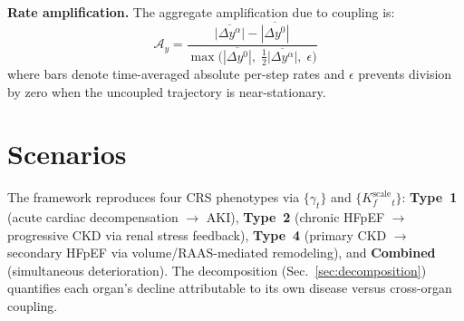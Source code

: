 \documentclass[10pt,twocolumn]{article}
\begin{document}
\textbf{Rate amplification.} The aggregate amplification due to coupling is:
\begin{equation}
\mathcal{A}_y = \frac{\overline{|\Delta y^{\alpha}|} - \overline{|\Delta y^{0}|}}{\max\!\bigl(\overline{|\Delta y^{0}|},\; \tfrac{1}{2}\overline{|\Delta y^{\alpha}|},\; \epsilon\bigr)}
\label{eq:amplification}
\end{equation}
where bars denote time-averaged absolute per-step rates and $\epsilon$ prevents division by zero when the uncoupled trajectory is near-stationary.

\section{Scenarios}
\label{sec:scenarios}

The framework reproduces four CRS phenotypes via $\{\gamma_t\}$ and $\{K_f^{\text{scale}}_t\}$: \textbf{Type~1} (acute cardiac decompensation $\to$ AKI), \textbf{Type~2} (chronic HFpEF $\to$ progressive CKD via renal stress feedback), \textbf{Type~4} (primary CKD $\to$ secondary HFpEF via volume/RAAS-mediated remodeling), and \textbf{Combined} (simultaneous deterioration). The decomposition (Sec.~\ref{sec:decomposition}) quantifies each organ's decline attributable to its own disease versus cross-organ coupling.

{\small


}
\end{document}
